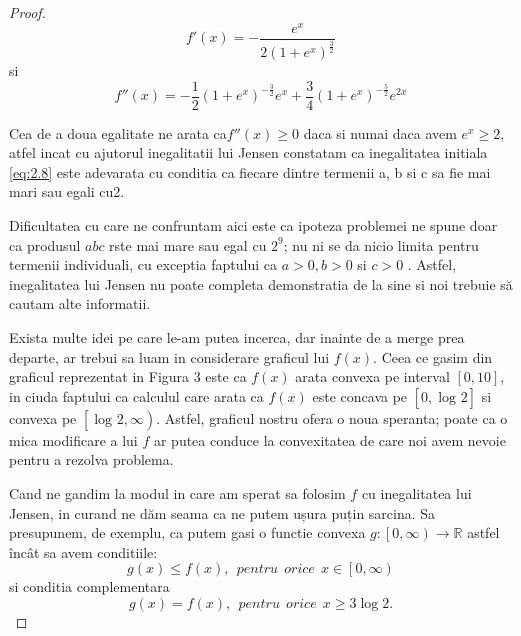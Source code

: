 \documentclass[a4paper,12pt,oneside]{report}
\begin{document}
\begin{proof}
\begin{displaymath}
  {f}'\left ( x \right ) = -\frac{e^{x}}{2 \left ( 1 + e^{x} \right )^{\frac{3}{2}}}
\end{displaymath}
si
\begin{displaymath}
  {f}''\left ( x \right ) = -\frac{1}{2}\left (  1 + e^{x} \right )^{-\frac{3}{2}}e^{x} + \frac{3}{4}\left ( 1 + e^{x} \right )^{-\frac{5}{2}}e^{2x}
\end{displaymath}

Cea de a doua egalitate ne arata ca\({f}''\left ( x \right ) \geq 0\) daca si numai daca avem \(e^{x}\geq 2\), atfel incat cu ajutorul inegalitatii lui Jensen  constatam ca inegalitatea initiala \ref{eq:2.8}  este adevarata cu conditia ca fiecare dintre termenii a, b si c sa fie mai mari sau egali cu2.

Dificultatea cu care ne confruntam aici este ca ipoteza problemei  ne spune doar  ca produsul \(abc\) rste mai mare sau egal cu \(2^{9}\); nu ni se da nicio  limita pentru termenii  individuali, cu exceptia faptului ca \( a > 0, b > 0 \) si \(c > 0\) . Astfel, inegalitatea lui Jensen nu poate completa demonstratia de la sine si noi trebuie să cautam alte informatii.

Exista multe idei pe care le-am putea incerca, dar inainte de a merge prea departe,  ar trebui sa luam in considerare graficul lui \(f\left ( x \right )\). Ceea ce  gasim  din graficul  reprezentat in Figura 3 este ca \(f\left ( x \right ) \) arata convexa pe interval \(\left [ 0, 10 \right ]  \), in ciuda faptului ca calculul care arata ca \(f\left ( x \right ) \) este concava pe \(\left [ 0, \log _{} 2\right ] \) si convexa pe \(\left [ \log _{} 2 , \infty \right ) \). Astfel, graficul nostru ofera o noua speranta; poate ca o mica modificare a lui \(f\) ar putea conduce la convexitatea de care noi avem nevoie pentru a rezolva problema.

Cand ne gandim la modul in care am sperat sa folosim \(f\) cu inegalitatea lui Jensen, in curand ne dăm seama ca ne putem ușura puțin sarcina. Sa presupunem, de exemplu, ca putem gasi o functie convexa \(g : \left [ 0 , \infty  \right ) \to \mathbb{R}\) astfel încât sa avem  conditiile:
\begin{displaymath}
  g\left ( x \right ) \leq  f\left ( x  \right ),~~ pentru~~ orice~~ x \in  \left [ 0 , \infty  \right )    \label{eq:2.9} \tag{2.9}
\end{displaymath}
si conditia complementara
\begin{displaymath}
  g \left ( x \right ) = f \left ( x \right ), ~~pentru~~ orice~~  x\geq 3 \log 2. \label{eq:2.10} \tag{2.10}
\end{displaymath}


\end{proof}
\end{document}
